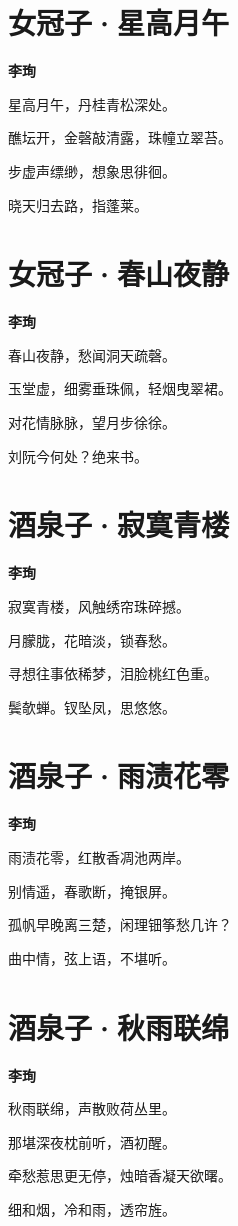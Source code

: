 \documentclass[12pt,a4paper]{ctexbook}
\begin{document}
\section{女冠子·星高月午}
\textbf{李珣}\par\vspace{0.5em}
星高月午，丹桂青松深处。\par
醮坛开，金磬敲清露，珠幢立翠苔。\par
步虚声缥缈，想象思徘徊。\par
晓天归去路，指蓬莱。\par

\section{女冠子·春山夜静}
\textbf{李珣}\par\vspace{0.5em}
春山夜静，愁闻洞天疏磬。\par
玉堂虚，细雾垂珠佩，轻烟曳翠裙。\par
对花情脉脉，望月步徐徐。\par
刘阮今何处？绝来书。\par

\section{酒泉子·寂寞青楼}
\textbf{李珣}\par\vspace{0.5em}
寂寞青楼，风触绣帘珠碎撼。\par
月朦胧，花暗淡，锁春愁。\par
寻想往事依稀梦，泪脸桃红色重。\par
鬓欹蝉。钗坠凤，思悠悠。\par

\section{酒泉子·雨渍花零}
\textbf{李珣}\par\vspace{0.5em}
雨渍花零，红散香凋池两岸。\par
别情遥，春歌断，掩银屏。\par
孤帆早晚离三楚，闲理钿筝愁几许？\par
曲中情，弦上语，不堪听。\par

\section{酒泉子·秋雨联绵}
\textbf{李珣}\par\vspace{0.5em}
秋雨联绵，声散败荷丛里。\par
那堪深夜枕前听，酒初醒。\par
牵愁惹思更无停，烛暗香凝天欲曙。\par
细和烟，冷和雨，透帘旌。\par
\end{document}
